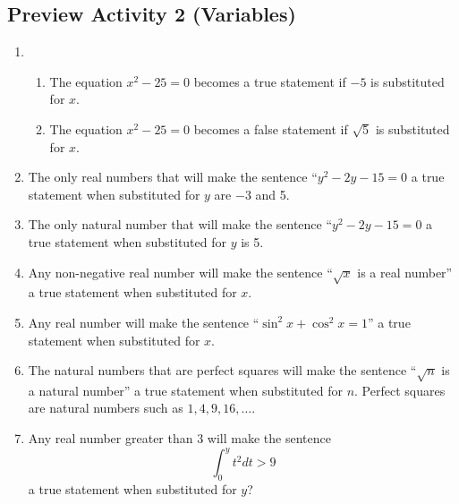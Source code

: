 \subsection*{Preview Activity 2 (Variables)}
\begin{enumerate}
  \item \begin{enumerate}
    \item The equation $x^2 - 25 = 0$ becomes a true statement if $-5$ is substituted for $x$.
    \item The equation $x^2 - 25 = 0$ becomes a false statement if $\sqrt{5}$ is substituted for $x$.
\end{enumerate}

  \item The only real numbers that will make the sentence ``$y^2 - 2y - 15 = 0$ a true statement when substituted for $y$ are $-3$ and 5.

  \item The only natural number that will make the sentence ``$y^2 - 2y - 15 = 0$ a true statement when substituted for $y$ is 5.

  \item Any non-negative real number will make the sentence ``$\sqrt{x}$  is a real number'' a true statement when substituted for $x$.

  \item Any real number will make the sentence ``$\sin ^2 x + \cos ^2 x = 1$'' a true statement when substituted for  $x$.


  \item The natural numbers that are perfect squares will make the sentence ``$\sqrt{n}$ is a natural number'' a true statement when substituted for $n$.  Perfect squares are natural numbers such as $1, 4, 9, 16,  \ldots $.

  \item Any real number greater than 3 will make the sentence 
  \[
   \int_0^y {t^2 dt > 9}
  \]
   a true statement when substituted for  $y$?
\end{enumerate}

\hbreak

\newpage

\endinput
